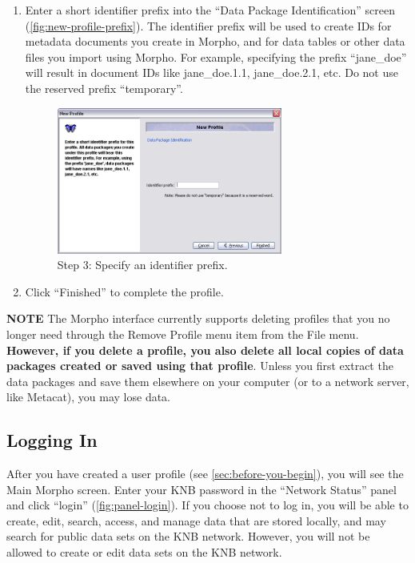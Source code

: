 \begin{enumerate}
  \item Enter a short identifier prefix into the ``Data Package
    Identification'' screen (\autoref{fig:new-profile-prefix}). The
    identifier prefix will be used to create IDs for metadata documents
    you create in Morpho, and for data tables or other data files you
    import using Morpho. For example, specifying the prefix
    ``jane\_doe'' will result in document IDs like jane\_doe.1.1,
    jane\_doe.2.1, etc. Do not use the reserved prefix ``temporary''.

  \begin{figure}
    \centering
      \includegraphics[width=0.7\textwidth]{images/new-profile-prefix.png}
    \caption{Step 3: Specify an identifier prefix.}
    \label{fig:new-profile-prefix}
  \end{figure}

  \item Click ``Finished'' to complete the profile.
\end{enumerate}

\begin{shaded}
  \textbf{NOTE} The Morpho interface currently supports deleting
  profiles that you no longer need through the Remove Profile menu item
  from the File menu. \textbf{However, if you delete a profile, you also
  delete all local copies of data packages created or saved using that
  profile}. Unless you first extract the data packages and save them
  elsewhere on your computer (or to a network server, like Metacat), you
  may lose data.
\end{shaded}

\subsection{Logging In}

After you have created a user profile (see
\autoref{sec:before-you-begin}), you will see the Main Morpho screen.
Enter your KNB password in the ``Network Status'' panel and click
``login'' (\autoref{fig:panel-login}). If you choose not to log in, you
will be able to create, edit, search, access, and manage data that are
stored locally, and may search for public data sets on the KNB network.
However, you will not be allowed to create or edit data sets on the KNB
network.

